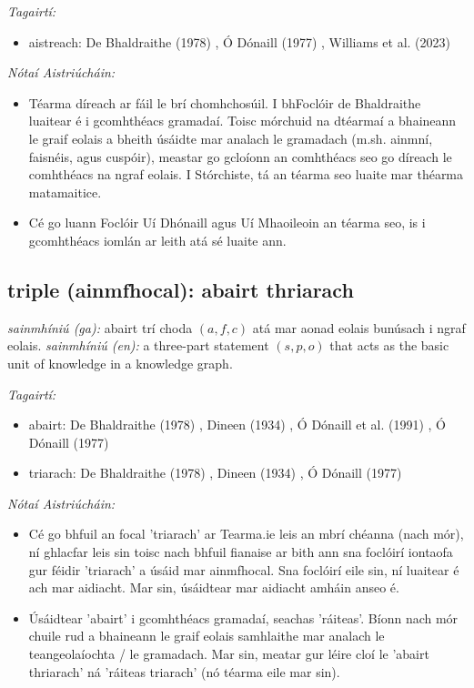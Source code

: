 \documentclass{article}
\begin{document}
 \noindent \textit{Tagairtí:}
\begin{itemize}
	\item aistreach: De Bhaldraithe (1978) \cite{de-bhaldraithe}, Ó Dónaill (1977) \cite{odonaill}, Williams et al. (2023) \cite{storchiste}
\end{itemize}

 \noindent \textit{Nótaí Aistriúcháin:}
\begin{itemize}
	\item Téarma díreach ar fáil le brí chomhchosúil. I bhFoclóir de Bhaldraithe luaitear é i gcomhthéacs gramadaí. Toisc mórchuid na dtéarmaí a bhaineann le graif eolais a bheith úsáidte mar analach le gramadach (m.sh. ainmní, faisnéis, agus cuspóir), meastar go gcloíonn an comhthéacs seo go díreach le comhthéacs na ngraf eolais. I Stórchiste, tá an téarma seo luaite mar théarma matamaitice.
	\item Cé go luann Foclóir Uí Dhónaill agus Uí Mhaoileoin an téarma seo, is i gcomhthéacs iomlán ar leith atá sé luaite ann.
\end{itemize}


\subsection*{triple (ainmfhocal): abairt thriarach} 
 \noindent \textit{sainmhíniú (ga):} abairt trí choda $(a,f,c)$ atá mar aonad eolais bunúsach i ngraf eolais.
\newline\newline
 \noindent \textit{sainmhíniú (en):} a three-part statement $(s,p,o)$ that acts as the basic unit of knowledge in a knowledge graph.
\newline

 \noindent \textit{Tagairtí:}
\begin{itemize}
	\item abairt: De Bhaldraithe (1978) \cite{de-bhaldraithe}, Dineen (1934) \cite{dineen}, Ó Dónaill et al. (1991) \cite{focloir-beag}, Ó Dónaill (1977) \cite{odonaill}
	\item triarach: De Bhaldraithe (1978) \cite{de-bhaldraithe}, Dineen (1934) \cite{dineen}, Ó Dónaill (1977) \cite{odonaill}
\end{itemize}

 \noindent \textit{Nótaí Aistriúcháin:}
\begin{itemize}
	\item Cé go bhfuil an focal 'triarach' ar Tearma.ie leis an mbrí chéanna (nach mór), ní ghlacfar leis sin toisc nach bhfuil fianaise ar bith ann sna foclóirí iontaofa gur féidir 'triarach' a úsáid mar ainmfhocal. Sna foclóirí eile sin, ní luaitear é ach mar aidiacht. Mar sin, úsáidtear mar aidiacht amháin anseo é.
	\item Úsáidtear 'abairt' i gcomhthéacs gramadaí, seachas 'ráiteas'. Bíonn nach mór chuile rud a bhaineann le graif eolais samhlaithe mar analach le teangeolaíochta / le gramadach. Mar sin, meatar gur léire cloí le 'abairt thriarach' ná 'ráiteas triarach' (nó téarma eile mar sin).
\end{itemize}
\end{document}
